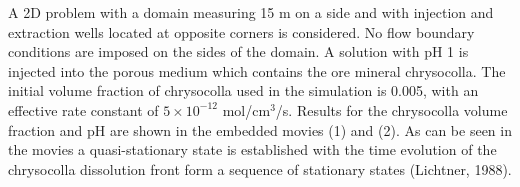 \documentclass[12pt]{article}
\begin{document}
A 2D problem with a domain measuring 15 m on a side and with injection and extraction wells located at opposite corners is considered. No flow boundary conditions are imposed on the sides of the domain. A solution with pH 1 is injected into the porous medium which contains the ore mineral chrysocolla. The initial volume fraction of chrysocolla used in the simulation is 0.005, with an effective rate constant of $5\times 10^{-12}$ mol/cm$^3$/s.
Results for the chrysocolla volume fraction and pH are shown in the embedded
movies (1) and (2).
As can be seen in the movies a quasi-stationary state is established with the time evolution of the chrysocolla dissolution front form a sequence of stationary states (Lichtner, 1988).

\setcounter{figure}{0}
\begin{center}
\begin{figure}[ht]
\label{fchry}
\end{figure}
\end{center}

\addtocounter{figure}{2}

\begin{center}
\begin{figure}[ht]
\label{fph}
\end{figure}
\end{center}
\end{document}
